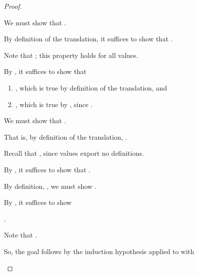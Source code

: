 {\begin{proof}
\begin{proofcases}
    We must show that
    \im{\styjudg{\anfh{\slenv}}{\anf{\spropty}{\tK}}{\tB}}.

    By definition of the translation, it suffices to show that
    \im{\styjudg{\anfh{\slenv}}{\tK\hw{\tpropty}}{\tB}}.

    Note that \im{\edefs{\spropty} = \cdot}; this property holds for all values.

    By , it suffices to show that
    \begin{enumerate}[leftmargin=*]
    \item \im{\ehole{\spropty} = \tpropty}, which is true by definition of the translation, and
    \item {}, which is true by , since .
    \end{enumerate}

  \item {}

    We must show that
    \im{\styjudg{\anfh{\slenv}}{\anf{\sfune{\sx}{\sApr}{\sepr}}{\tK}}{\tB}}.

    That is, by definition of the translation,
    \im{\styjudg{\anfh{\slenv}}{\tK\hw{\tfune{\tx}{\anfh{\sApr}}{\anfh{\sepr}}}}{\tB}}.

    Recall that \im{\edefs{\sfune{\sx}{\sApr}{\sepr}} = \cdot}, since values export no definitions.

    By , it suffices to show that
    \im{\styjudg{\anfh{\slenv}}{\tfune{\tx}{\anfh{\sApr}}{\anfh{\sepr}}}{\anfh{\spity{\sx}{\sApr}{\sBpr}}}}.

    By definition, \im{\anfh{\spity{\sx}{\sApr}{\sBpr}} =
      \tpity{\tx}{\anfh{\sApr}}{\anfh{\sBpr}}}, we must show
    \im{\styjudg{\anfh{\slenv}}{\tfune{\tx}{\anfh{\sApr}}{\anfh{\sepr}}}{\tpity{\tx}{\anfh{\sApr}}{\anfh{\sBpr}}}}.

    By , it suffices to show

    \im{\styjudg{\anfh{\slenv},\tx:\anfh{\sApr}}{\anfh{\sepr}}{\anfh{\sBpr}}}.

    Note that \im{\styjudg{\anfh{\slenv}}{\hole}{(\_ : \anfh{\sBpr}) \Rightarrow \anfh{\sBpr}}}.

    So, the goal follows by the induction hypothesis applied to \im{\styjudg{\slenv,\sx:\sApr}{\sepr}{\sBpr}} with \im{\tK = \hole}

    \item {}


\end{proofcases}
\end{proof}}
